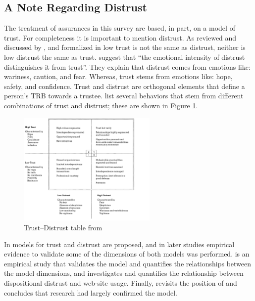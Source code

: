 \subsection{A Note Regarding Distrust}
    The treatment of assurances in this survey are based, in part, on a model of trust. For completeness it is important to mention distrust. As reviewed and discussed by \citet{Lewicki1998-ox}, and formalized in \cite{McKnight2001-hm,McKnight2001-gz} low trust is not the same as distrust, neither is low distrust the same as trust. \citet{McKnight2001-gz} suggest that ``the emotional intensity of distrust distinguishes it from trust''. They explain that distrust comes from emotions like: wariness, caution, and fear. Whereas, trust stems from emotions like: hope, safety, and confidence. Trust and distrust are orthogonal elements that define a person's TRB towards a trustee. \citet{Lewicki1998-ox} list several behaviors that stem from different combinations of trust and distrust; these are shown in Figure \ref{fig:distrust_table}.

    \begin{figure}[!htbp]
        \centering
        \includegraphics[width=0.6\textwidth]{Figures/distrust_table}
        \caption{Trust--Distrust table from \cite{Lewicki1998-ox}}
        \label{fig:distrust_table}
    \end{figure}

    In \citet{McKnight2001-gz} models for trust and distrust are proposed, and in later studies empirical evidence to validate some of the dimensions of both models was performed. \citet{McKnight2002-qx} is an empirical study that validates the model and quantifies the relationships between the model dimensions, and \citet{McKnight2004-vv} investigates and quantifies the relationship between dispositional distrust and web-site usage. Finally, \citet{McKnight2006-ce} revisits the position of \citet{McKnight1998-ty} and concludes that research had largely confirmed the model.

